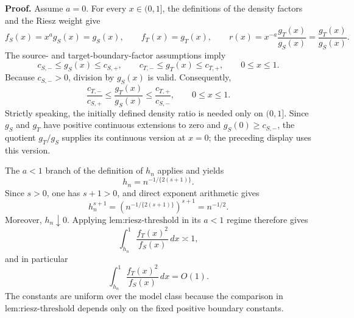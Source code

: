 \textbf{Proof.}
Assume \(a=0\).  For every \(x\in(0,1]\), the definitions of the density
factors and the Riesz weight give
\[
 f_S(x)=x^a g_S(x)=g_S(x),\qquad
 f_T(x)=g_T(x),\qquad
 r(x)=x^{-a}\frac{g_T(x)}{g_S(x)}=\frac{g_T(x)}{g_S(x)}.
\]
The source- and target-boundary-factor assumptions imply
\[
 c_{S,-}\le g_S(x)\le c_{S,+},
 \qquad
 c_{T,-}\le g_T(x)\le c_{T,+},
 \qquad 0\le x\le1.
\]
Because \(c_{S,-}>0\), division by \(g_S(x)\) is valid.  Consequently,
\[
 \frac{c_{T,-}}{c_{S,+}}
 \le \frac{g_T(x)}{g_S(x)}
 \le \frac{c_{T,+}}{c_{S,-}},
 \qquad 0\le x\le1.
\]
Strictly speaking, the initially defined density ratio is needed only on
\((0,1]\).  Since \(g_S\) and \(g_T\) have positive continuous extensions
to zero and \(g_S(0)\ge c_{S,-}\), the quotient \(g_T/g_S\) supplies its
continuous version at \(x=0\); the preceding display uses this version.

The \(a<1\) branch of the definition of \(h_n\) applies and yields
\[
 h_n=n^{-1/\{2(s+1)\}}.
\]
Since \(s>0\), one has \(s+1>0\), and direct exponent arithmetic gives
\[
 h_n^{s+1}
 =\left(n^{-1/\{2(s+1)\}}\right)^{s+1}
 =n^{-1/2}.
\]
Moreover, \(h_n\downarrow0\).  Applying
\(\text{lem:riesz-threshold}\) in its \(a<1\) regime therefore gives
\[
 \int_{h_n}^1\frac{f_T(x)^2}{f_S(x)}\,dx\asymp1,
\]
and in particular
\[
 \int_{h_n}^1\frac{f_T(x)^2}{f_S(x)}\,dx=O(1).
\]
The constants are uniform over the model class because the comparison in
\(\text{lem:riesz-threshold}\) depends only on the fixed positive boundary
constants.


